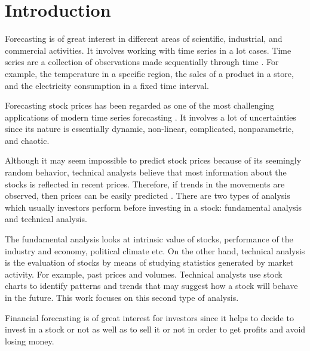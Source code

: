 \chapter{Introduction}
\label{ch:introsm}


Forecasting is of great interest in different areas of scientific, industrial, and commercial activities. It involves working with time series in a lot cases. Time series are a collection of observations made sequentially through time \cite{chatfield2000time}. For example, the temperature in a specific region, the sales of a product in a store, and the electricity consumption in a fixed time interval.

Forecasting stock prices has been regarded as one of the most challenging applications of modern time series forecasting \cite{pai2005hybrid}. It involves a lot of uncertainties since its nature is essentially dynamic, non-linear, complicated, nonparametric, and chaotic.

Although it may seem impossible to predict stock prices because of its seemingly random behavior, technical analysts believe that most information about the stocks is reflected in recent prices. Therefore, if trends in the movements are observed, then prices can be easily predicted \cite{patel2015predicting}. There are two types of analysis which usually investors perform before investing in a stock: fundamental analysis and technical analysis.

The fundamental analysis looks at intrinsic value of stocks, performance of the industry and economy, political climate etc. On the other hand, technical analysis is the evaluation of stocks by means of studying statistics generated by market activity. For example, past prices and volumes. Technical analysts use stock charts to identify patterns and trends that may suggest how a stock will behave in the future\cite{patel2015predicting}. This work focuses on this second type of analysis.

Financial forecasting is of great interest for investors since it helps to decide to invest in a stock or not as well as to sell it or not in order to get profits and avoid losing money. 

